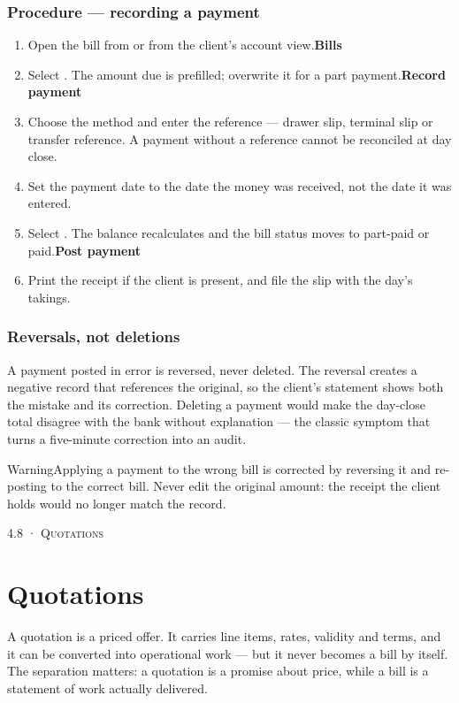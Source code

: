 \documentclass[11pt,a4paper,oneside]{book}
\begin{document}
\subsubsection*{Procedure — recording a payment}
\begin{enumerate}
\item Open the bill from  or from the client's account view.\textbf{Bills}
\item Select . The amount due is prefilled; overwrite it for a part payment.\textbf{Record payment}
\item Choose the method and enter the reference — drawer slip, terminal slip or transfer reference. A payment without a reference cannot be reconciled at day close.
\item Set the payment date to the date the money was received, not the date it was entered.
\item Select . The balance recalculates and the bill status moves to part-paid or paid.\textbf{Post payment}
\item Print the receipt if the client is present, and file the slip with the day's takings.
\end{enumerate}
\subsubsection*{Reversals, not deletions}
A payment posted in error is reversed, never deleted. The reversal creates a negative record that references the original, so the client's statement shows both the mistake and its correction. Deleting a payment would make the day-close total disagree with the bank without explanation — the classic symptom that turns a five-minute correction into an audit.

\begin{notebox}WarningApplying a payment to the wrong bill is corrected by reversing it and re-posting to the correct bill. Never edit the original amount: the receipt the client holds would no longer match the record.\end{notebox}
\textsc{\small\color{crimson}4.8 · Quotations}\par\medskip
\section*{Quotations}
A quotation is a priced offer. It carries line items, rates, validity and terms, and it can be converted into operational work — but it never becomes a bill by itself. The separation matters: a quotation is a promise about price, while a bill is a statement of work actually delivered.
\end{document}
